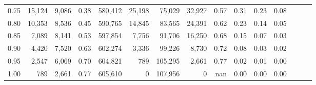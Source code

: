 \begin{tabular}{rrrrrrrrrrrrrrr}
0.75 &  15,124 &  9,086 &  0.38 &  580,412 &   25,198 &   75,029 &   32,927 &  0.57 &  0.31 &  0.23 &      0.08 \\
0.80 &  10,353 &  8,536 &  0.45 &  590,765 &   14,845 &   83,565 &   24,391 &  0.62 &  0.23 &  0.14 &      0.05 \\
0.85 &   7,089 &  8,141 &  0.53 &  597,854 &    7,756 &   91,706 &   16,250 &  0.68 &  0.15 &  0.07 &      0.03 \\
0.90 &   4,420 &  7,520 &  0.63 &  602,274 &    3,336 &   99,226 &    8,730 &  0.72 &  0.08 &  0.03 &      0.02 \\
0.95 &   2,547 &  6,069 &  0.70 &  604,821 &      789 &  105,295 &    2,661 &  0.77 &  0.02 &  0.01 &      0.00 \\
1.00 &     789 &  2,661 &  0.77 &  605,610 &        0 &  107,956 &        0 &   nan &  0.00 &  0.00 &      0.00 \\
\bottomrule
\end{tabular}
